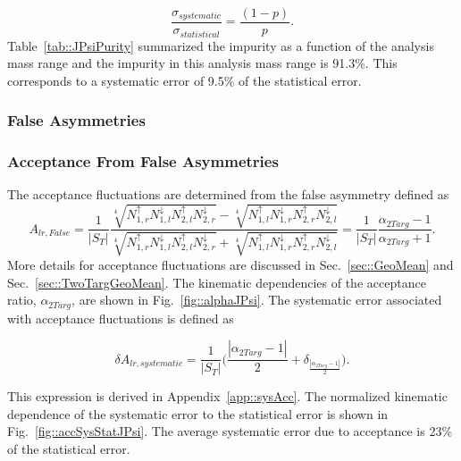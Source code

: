 \begin{equation}
  \frac{\sigma_{systematic}}{\sigma_{statistical}} = \frac{(1-p)}{p}.
\end{equation}
\noindent
Table~\ref{tab::JPsiPurity} summarized the impurity as a function of the
analysis mass range and the impurity in this analysis mass range is 91.3\%.
This corresponds to a systematic error of 9.5\% of the statistical error.

\subsubsection{False Asymmetries}
\subsubsection{Acceptance From False Asymmetries}
The acceptance fluctuations are determined from the false asymmetry defined as
\begin{equation}
  A_{lr,False} = 
    \frac{1}{|S_T|}
    \frac{
      \sqrt[4]{
        N_{1,r}^\uparrow N_{1, l}^\downarrow
        N_{2,l}^\uparrow N_{2, r}^\downarrow
      } 
      -\sqrt[4]{
        N_{1,l}^\uparrow N_{1, r}^\downarrow
        N_{2,r}^\uparrow N_{2, l}^\downarrow
      }
    }{
      \sqrt[4]{
        N_{1,r}^\uparrow N_{1, l}^\downarrow
        N_{2,l}^\uparrow N_{2, r}^\downarrow
      } +
      \sqrt[4]{
        N_{1,l}^\uparrow N_{1, r}^\downarrow
        N_{2,r}^\uparrow N_{2, l}^\downarrow
      }
    } 
    = \frac{1}{|S_T|}
    \frac{
      \alpha_{2Targ} - 1     
    }{
      \alpha_{2Targ} + 1
    }.
    \label{equ::falseAccJPsi}
\end{equation}
\noindent
More details for acceptance fluctuations are discussed in
Sec.~\ref{sec::GeoMean} and Sec.~\ref{sec::TwoTargGeoMean}.  The kinematic
dependencies of the acceptance ratio, $\alpha_{2Targ}$, are shown in
Fig.~\ref{fig::alphaJPsi}.  The systematic error associated with acceptance
fluctuations is defined as

\begin{equation}
  \delta A_{lr,systematic} =
  \frac{1}{|S_T|}
  \Big(\frac{|\alpha_{2Targ}-1|}{2}
  + \delta_{\frac{|\alpha_{2Targ}-1|}{2}} \Big).
\end{equation}

\noindent
This expression is derived in Appendix~\ref{app::sysAcc}.  The normalized
kinematic dependence of the systematic error to the statistical error is shown
in Fig.~\ref{fig::accSysStatJPsi}.  The average systematic error due to
acceptance is 23\% of the statistical error.

